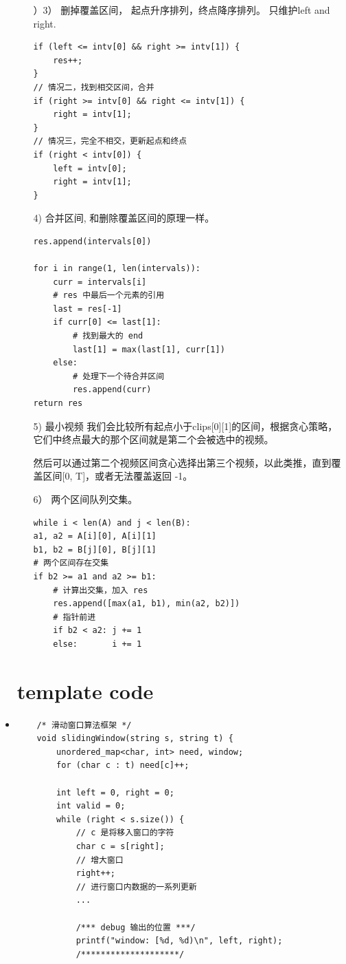 \documentclass[a4paper,11pt,twoside]{book}
\begin{document}
\begin{itemize}
\begin{itemize}
）3） 删掉覆盖区间， 起点升序排列，终点降序排列。 只维护left and right.
\begin{lstlisting}
if (left <= intv[0] && right >= intv[1]) {
	res++;
}
// 情况二，找到相交区间，合并
if (right >= intv[0] && right <= intv[1]) {
	right = intv[1];
}
// 情况三，完全不相交，更新起点和终点
if (right < intv[0]) {
	left = intv[0];
	right = intv[1];
}
\end{lstlisting}
4) 合并区间, 和删除覆盖区间的原理一样。
\begin{lstlisting}
res.append(intervals[0])

for i in range(1, len(intervals)):
	curr = intervals[i]
	# res 中最后一个元素的引用
	last = res[-1]
	if curr[0] <= last[1]:
		# 找到最大的 end
		last[1] = max(last[1], curr[1])
	else:
		# 处理下一个待合并区间
		res.append(curr)
return res
\end{lstlisting}

5) 最小视频 我们会比较所有起点小于clips[0][1]的区间，根据贪心策略，它们中终点最大的那个区间就是第二个会被选中的视频。

然后可以通过第二个视频区间贪心选择出第三个视频，以此类推，直到覆盖区间[0, T]，或者无法覆盖返回 -1。

6） 两个区间队列交集。
\begin{lstlisting}
while i < len(A) and j < len(B):
a1, a2 = A[i][0], A[i][1]
b1, b2 = B[j][0], B[j][1]
# 两个区间存在交集
if b2 >= a1 and a2 >= b1:
	# 计算出交集，加入 res
	res.append([max(a1, b1), min(a2, b2)])
	# 指针前进
	if b2 < a2: j += 1
	else:       i += 1
\end{lstlisting}

\end{itemize}
	
\section{template code}
	\item 
\begin{lstlisting}
	/* 滑动窗口算法框架 */
	void slidingWindow(string s, string t) {
		unordered_map<char, int> need, window;
		for (char c : t) need[c]++;
		
		int left = 0, right = 0;
		int valid = 0; 
		while (right < s.size()) {
			// c 是将移入窗口的字符
			char c = s[right];
			// 增大窗口
			right++;
			// 进行窗口内数据的一系列更新
			...
			
			/*** debug 输出的位置 ***/
			printf("window: [%d, %d)\n", left, right);
			/********************/
			

\end{lstlisting}
\end{itemize}
\end{document}
